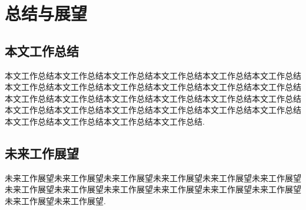 \chapter{总结与展望}

\section{本文工作总结}
	本文工作总结本文工作总结本文工作总结本文工作总结本文工作总结本文工作总结本文工作总结本文工作总结本文工作总结本文工作总结本文工作总结本文工作总结本文工作总结本文工作总结本文工作总结本文工作总结本文工作总结本文工作总结本文工作总结本文工作总结本文工作总结本文工作总结本文工作总结本文工作总结本文工作总结本文工作总结本文工作总结本文工作总结.
	
\section{未来工作展望}

未来工作展望未来工作展望未来工作展望未来工作展望未来工作展望未来工作展望未来工作展望未来工作展望未来工作展望未来工作展望未来工作展望未来工作展望未来工作展望未来工作展望.





